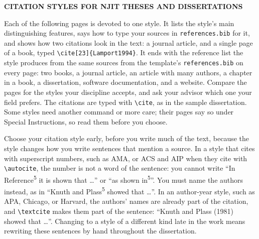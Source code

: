 \documentclass[12pt,letterpaper]{article}
\begin{document}
\thispagestyle{empty}
\setlength{\parindent}{0.5in}
\doublespacing

\begin{center}\normalsize\bfseries
CITATION STYLES FOR NJIT THESES AND DISSERTATIONS
\end{center}
\vspace{12pt}

\noindent Each of the following pages is devoted to one style. It lists the style's main distinguishing features, says how to type your sources in \texttt{references.bib} for it, and shows how two citations look in the text: a journal article, and a single page of a book, typed \verb+\cite[23]{Lamport1994}+. It ends with the reference list the style produces from the same sources from the template's \texttt{references.bib} on every page: two books, a journal article, an article with many authors, a chapter in a book, a dissertation, software documentation, and a website. Compare the pages for the styles your discipline accepts, and ask your advisor which one your field prefers. The citations are typed with \verb+\cite+, as in the sample dissertation. Some styles need another command or more care; their pages say so under Special Instructions, so read them before you choose.

Choose your citation style early, before you write much of the text, because the style changes how you write sentences that mention a source. In a style that cites with superscript numbers, such as AMA, or ACS and AIP when they cite with \verb+\autocite+, the number is not a word of the sentence: you cannot write ``In Reference\textsuperscript{5} it is shown that \ldots'' or ``as shown in\textsuperscript{5}''. You must name the authors instead, as in ``Knuth and Plass\textsuperscript{5} showed that \ldots''. In an author-year style, such as APA, Chicago, or Harvard, the authors' names are already part of the citation, and \verb+\textcite+ makes them part of the sentence: ``Knuth and Plass (1981) showed that \ldots''. Changing to a style of a different kind late in the work means rewriting these sentences by hand throughout the dissertation.
\end{document}
